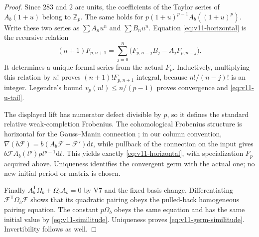 \documentclass[11pt]{article}
\theoremstyle{definition}
\theoremstyle{remark}
\newcommand{\Z}{\mathbb Z}
\newcommand{\dd}{\mathrm d}
\begin{document}
\begin{proof}
Since $283$ and $2$ are units, the coefficients of the Taylor series
of $A_b(1+u)$ belong to $\Z_p$. The same holds for
$p(1+u)^{p-1}A_b((1+u)^p)$. Write these two series as
$\sum A_nu^n$ and $\sum B_nu^n$. Equation
\cref{eq:v11-horizontal} is the recursive relation
\begin{equation}
 (n+1)F_{p,n+1}
 =\sum_{j=0}^{n}\bigl(F_{p,n-j}B_j-A_jF_{p,n-j}\bigr).
 \label{eq:v11-horizontal-rec}
\end{equation}
It determines a unique formal series from the actual $F_p$.
Inductively, multiplying this relation by $n!$ proves
$(n+1)!F_{p,n+1}$ integral, because
$n!/(n-j)!$ is an integer. Legendre's bound
$v_p(n!)\le n/(p-1)$ proves convergence and
\cref{eq:v11-u-tail}.

The displayed lift has numerator defect divisible by $p$, so it defines
the standard relative weak-completion Frobenius. The cohomological
Frobenius structure is horizontal for the Gauss--Manin connection
\cite{KedlayaFrobBook,KedlayaTuitman}; in our column convention,
$\nabla(b\mathcal F)=b(A_b\mathcal F+\mathcal F')\dd t$,
while pullback of the connection on the input gives
$b\mathcal F A_b(t^p)p t^{p-1}\dd t$.
This yields exactly \cref{eq:v11-horizontal}, with specialization
$F_p$ acquired above. Uniqueness identifies the convergent germ with
the actual one; no new initial period or matrix is chosen.

Finally $A_b^{\mathsf T}\Omega_b+\Omega_bA_b=0$ by V7 and the
fixed basis change. Differentiating
$\mathcal F^{\mathsf T}\Omega_b\mathcal F$ shows that its
quadratic pairing obeys the pulled-back homogeneous pairing equation.
The constant $p\Omega_b$ obeys the same equation and has the same
initial value by \cref{eq:v11-similitude}. Uniqueness proves
\cref{eq:v11-germ-similitude}. Invertibility follows as well.
\end{proof}
\end{document}
